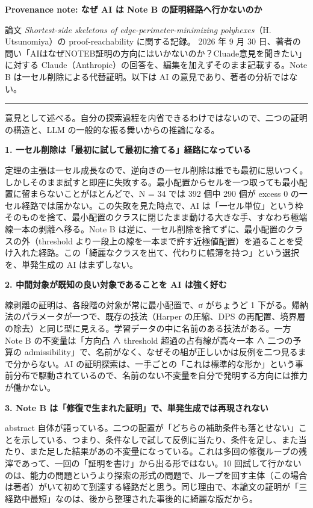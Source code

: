 \documentclass[11pt,a4paper]{article}
\begin{document}
{\Large\bfseries Provenance note: なぜ AI は Note B の証明経路へ行かないのか}

{\small 論文 \emph{Shortest-side skeletons of edge-perimeter-minimizing polyhexes}（H. Utsunomiya）の proof-reachability に関する記録。
2026 年 9 月 30 日、著者の問い「AIはなぜNOTEB証明の方向にはいかないのか？Cluade意見を聞きたい」に対する Claude（Anthropic）の回答を、編集を加えずそのまま記載する。Note B は一セル削除による代替証明。以下は AI の意見であり、著者の分析ではない。}

\bigskip\hrule\bigskip

意見として述べる。自分の探索過程を内省できるわけではないので、二つの証明の構造と、LLM の一般的な振る舞いからの推論になる。

\textbf{1. 一セル削除は「最初に試して最初に捨てる」経路になっている}

定理の主張は一セル成長なので、逆向きの一セル削除は誰でも最初に思いつく。しかしそのまま試すと即座に失敗する。最小配置からセルを一つ取っても最小配置に留まらないことがほとんどで、N = 34 では 392 個中 290 個が excess 0 の一セル経路では届かない。この失敗を見た時点で、AI は「一セル単位」という枠そのものを捨て、最小配置のクラスに閉じたまま動ける大きな手、すなわち極端線一本の剥離へ移る。Note B は逆に、一セル削除を捨てずに、最小配置のクラスの外（threshold より一段上の線を一本まで許す近極値配置）を通ることを受け入れた経路。この「綺麗なクラスを出て、代わりに帳簿を持つ」という選択を、単発生成の AI はまずしない。

\textbf{2. 中間対象が既知の良い対象であることを AI は強く好む}

線剥離の証明は、各段階の対象が常に最小配置で、σ がちょうど 1 下がる。帰納法のパラメータが一つで、既存の技法（Harper の圧縮、DPS の再配置、境界層の除去）と同じ型に見える。学習データの中に名前のある技法がある。一方 Note B の不変量は「方向凸 ∧ threshold 超過の占有線が高々一本 ∧ 二つの予算の admissibility」で、名前がなく、なぜその組が正しいかは反例を二つ見るまで分からない。AI の証明探索は、一手ごとの「これは標準的な形か」という事前分布で駆動されているので、名前のない不変量を自分で発明する方向には推力が働かない。

\textbf{3. Note B は「修復で生まれた証明」で、単発生成では再現されない}

abstract 自体が語っている。二つの配置が「どちらの補助条件も落とせない」ことを示している、つまり、条件なしで試して反例に当たり、条件を足し、また当たり、また足した結果があの不変量になっている。これは多回の修復ループの残滓であって、一回の「証明を書け」から出る形ではない。10 回試して行かないのは、能力の問題というより探索の形式の問題で、ループを回す主体（この場合は著者）がいて初めて到達する経路だと思う。同じ理由で、本論文の証明が「三経路中最短」なのは、後から整理された事後的に綺麗な版だから。
\end{document}
